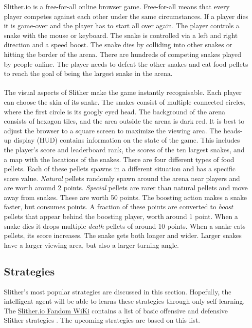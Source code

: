 Slither.io is a free-for-all online browser game. Free-for-all means that every player competes against each other under the same circumstances. If a player dies it is game-over and the player has to start all over again. The player controls a snake with the mouse or keyboard. The snake is controlled via a left and right direction and a speed boost. The snake dies by colliding into other snakes or hitting the border of the arena. There are hundreds of competing snakes played by people online. The player needs to defeat the other snakes and eat food pellets to reach the goal of being the largest snake in the arena. 
\\\\
The visual aspects of Slither make the game instantly recognisable. Each player can choose the skin of its snake. The snakes consist of multiple connected circles, where the first circle is its googly eyed head. The background of the arena consists of hexagon tiles, and the area outside the arena is dark red. It is best to adjust the browser to a square screen to maximize the viewing area. The heads-up display (HUD) contains information on the state of the game. This includes the player's score and leaderboard rank, the scores of the ten largest snakes, and a map with the locations of the snakes. 
\newpage \noindent
There are four different types of food pellets. Each of these pellets spawns in a different situation and has a specific score value. \textit{Natural} pellets randomly spawn around the arena near players and are worth around 2 points. \textit{Special} pellets are rarer than natural pellets and move away from snakes. These are worth 50 points. The boosting action makes a snake faster, but consumes points. A fraction of these points are converted to \textit{boost} pellets that appear behind the boosting player, worth around 1 point. When a snake dies it drops multiple \textit{death} pellets of around 10 points. When a snake eats pellets, its score increases. The snake gets both longer and wider. Larger snakes have a larger viewing area, but also a larger turning angle.









\subsection{Strategies}
Slither's most popular strategies are discussed in this section. Hopefully, the intelligent agent will be able to learns these strategies through only self-learning. The \href{https://slitherio-archive.fandom.com/wiki/Strategies}{Slither.io Fandom WiKi} contains a list of basic offensive and defensive Slither strategies \cite{web:Slitherio_Community}. The upcoming strategies are based on this list.

